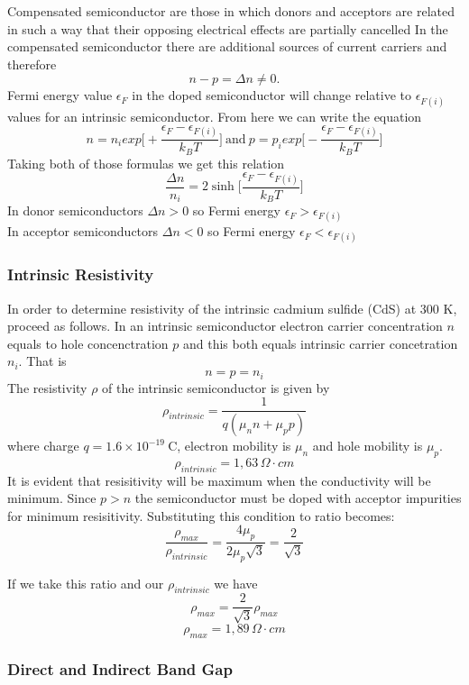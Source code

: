 Compensated semiconductor are those in which donors and acceptors are related in such a way that their opposing electrical effects are partially cancelled
In the compensated semiconductor there are additional sources of current carriers and therefore
$$
n - p = \Delta n \neq 0.
$$
Fermi energy value $\epsilon_F$ in the doped semiconductor will change relative to $\epsilon_{F(i)}$ values for an intrinsic semiconductor. From here we can write the equation
$$
n = n_i exp\bigg[+\frac{\epsilon_F - \epsilon_{F(i)}}{k_B T}\bigg] \ \mathrm{and} \
p = p_i exp\bigg[-\frac{\epsilon_F - \epsilon_{F(i)}}{k_B T}\bigg]
$$
Taking both of those formulas we get this relation
\begin{equation}
\frac{\Delta n}{n_i} = 2\sinh{\bigg[\frac{\epsilon_F - \epsilon_{F(i)}}{k_B T}\bigg]}
\end{equation}
In donor semiconductors $\Delta n > 0$ so Fermi energy $\epsilon_F > \epsilon_{F(i)}$ \\
In acceptor semiconductors $\Delta n < 0$ so Fermi energy $\epsilon_F < \epsilon_{F(i)}$

\subsubsection*{Intrinsic Resistivity}
In order to determine resistivity of the intrinsic cadmium sulfide (CdS) at 300 K, proceed as follows. In an intrinsic semiconductor electron carrier concentration $n$ equals to hole concenctration $p$ and this both equals intrinsic carrier concetration $n_i$. That is
$$
n = p = n_i 
$$
The resistivity $\rho$ of the intrinsic semiconductor is given by
$$
\rho_{intrinsic} = \frac{1}{q(\mu_nn + \mu_pp)}
$$
where charge $q = 1.6 \times 10^{-19}\ \mathrm{C}$, electron mobility is $\mu_n$ and hole mobility is $\mu_p$.
$$
\rho_{intrinsic} = 1,63 \, \Omega \cdot cm
$$
It is evident that resisitivity will be maximum when the conductivity will be minimum. Since $p > n$ the semiconductor must be doped with acceptor impurities for minimum resisitivity. Substituting this condition to ratio becomes:
$$
\frac{\rho_{max}}{\rho_{intrinsic}} = \frac{4 \mu_p}{2\mu_p \sqrt{3}} = \frac{2}{\sqrt{3}}
$$


If we take this ratio and our $\rho_{intrinsic}$ we have
$$
\rho_{max} = \frac{2}{\sqrt{3}} \rho_{max}
$$
$$
\rho_{max} = 1,89 \, \Omega \cdot cm
$$

\subsubsection*{Direct and Indirect Band Gap}

